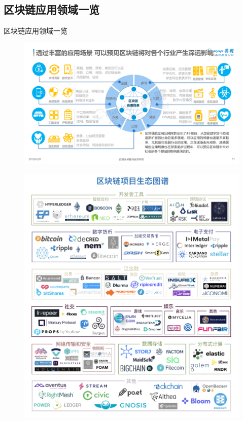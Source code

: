 \documentclass[11pt]{beamer}
\begin{document}
\subsection{区块链应用领域一览}
\begin{frame}[allowframebreaks]{区块链应用领域一览}
	\begin{figure}
		\centering
		\includegraphics[width=0.9\linewidth]{figures/blockchainapplications}
		\label{fig:blockchainapplications}
	\end{figure}

	\begin{figure}
		\centering
		\includegraphics[height=0.85\textheight]{figures/blockchainenv}
		\label{fig:blockchainenv}
	\end{figure}
\end{frame}
\end{document}
